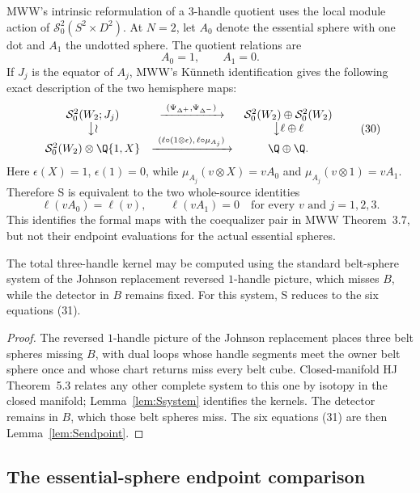 MWW's intrinsic reformulation of a $3$-handle quotient uses the local module
action of $\mathcal S^2_0(S^2\times D^2)$.  At $N=2$, let $A_0$ denote the
essential sphere with one dot and $A_1$ the undotted sphere.  The quotient
relations are
\[
A_0=1,\qquad A_1=0.
\]
If $J_j$ is the equator of $A_j$, MWW's K\"unneth identification gives the
following exact description of the two hemisphere maps:
\[
\begin{array}{ccc}
\mathcal S^2_0(W_2;J_j)&\xrightarrow{\ (\Psi_{\Delta^+},\Psi_{\Delta^-})\ }&
\mathcal S^2_0(W_2)\oplus\mathcal S^2_0(W_2)\\
\big\downarrow\wr&&\big\downarrow{\ell\oplus\ell}\\
\mathcal S^2_0(W_2)\otimes\Q\{1,X\}
&\xrightarrow{\ (\ell\circ(1\otimes\epsilon),\,\ell\circ\mu_{A_j})\ }&
\Q\oplus\Q.
\end{array}
\tag{30}
\]
Here $\epsilon(X)=1$, $\epsilon(1)=0$, while
$\mu_{A_j}(v\otimes X)=vA_0$ and
$\mu_{A_j}(v\otimes1)=vA_1$.  Therefore S is equivalent to the two
whole-source identities
\[
\ell(vA_0)=\ell(v),\qquad \ell(vA_1)=0
\quad\text{for every }v\text{ and }j=1,2,3.
\tag{31}
\]
This identifies the formal maps with the coequalizer pair in MWW
Theorem~3.7, but not their endpoint evaluations for the actual essential
spheres.

\begin{proposition}\label{thm:Sgeometry}
The total three-handle kernel may be computed using the standard belt-sphere
system of the Johnson replacement reversed $1$-handle picture, which misses
$B$, while the detector in $B$ remains fixed.  For this system, S reduces to
the six equations (31).
\end{proposition}

\begin{proof}
The reversed $1$-handle picture of the Johnson replacement places three
belt spheres missing $B$, with dual loops whose handle segments meet the
owner belt sphere once and whose chart returns miss every belt cube.
Closed-manifold HJ Theorem~5.3 relates any other complete
system to this one by isotopy in the closed manifold; Lemma~\ref{lem:Ssystem}
identifies the kernels.  The detector remains in $B$, which those belt
spheres miss.  The six equations (31) are then Lemma~\ref{lem:Sendpoint}.
\end{proof}

\subsection{The essential-sphere endpoint comparison}

